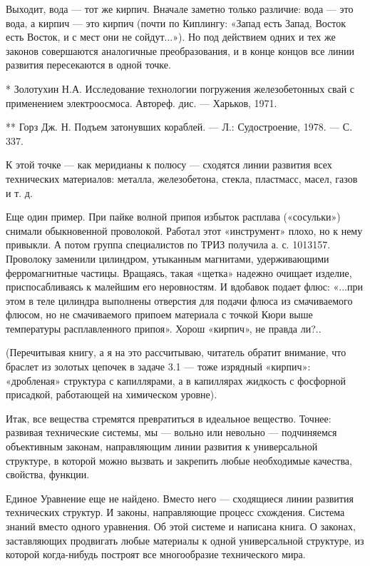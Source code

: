 Выходит, вода — тот же кирпич. Вначале заметно только различие: вода —
это вода, а кирпич — это кирпич (почти по Киплингу: «Запад есть Запад,
Восток есть  Восток, и  с мест  они не  сойдут...»). Но  под действием
одних и  тех же  законов совершаются  аналогичные преобразования,  и в
конце концов все линии развития пересекаются в одной точке.


*  Золотухин Н.А.  Исследование  технологии погружения  железобетонных
свай с применением электроосмоса. Автореф. дис. — Харьков, 1971.

** Горз Дж. Н. Подъем затонувших кораблей. — Л.: Судостроение, 1978. —
С. 337.


К этой точке  — как меридианы к полюсу —  сходятся линии развития всех
технических  материалов:  металла,  железобетона,  стекла,  пластмасс,
масел, газов и т. д.

Еще один пример. При пайке волной припоя избыток расплава («сосульки»)
снимали обыкновенной  проволокой. Работал этот «инструмент»  плохо, но
к  нему  привыкли.  А  потом  группа  специалистов  по  ТРИЗ  получила
а.  с. 1013157.  Проволоку  заменили  цилиндром, утыканным  магнитами,
удерживающими ферромагнитные частицы.  Вращаясь, такая «щетка» надежно
очищает  изделие,  приспосабливаясь  к  малейшим  его  неровностям.  И
вдобавок подает флюс: «...при этом в теле цилиндра выполнены отверстия
для подачи  флюса из смачиваемого  флюсом, но не  смачиваемого припоем
материала с точкой Кюри выше температуры расплавленного припоя». Хорош
«кирпич», не правда ли?..

(Перечитывая книгу, а я на это рассчитываю, читатель обратит внимание,
что браслет из золотых цепочек в  задаче 3.1 — тоже изрядный «кирпич»:
«дробленая»  структура  с  капиллярами,  а  в  капиллярах  жидкость  с
фосфорной присадкой, работающей на химическом уровне).

Итак,  все  вещества  стремятся  превратиться  в  идеальное  вещество.
Точнее:  развивая  технические  системы,  мы  —  вольно  или  невольно
—  подчиняемся  объективным  законам, направляющим  линии  развития  к
универсальной  структуре, в  которой можно  вызвать и  закрепить любые
необходимые качества, свойства, функции.


Единое  Уравнение  еще не  найдено.  Вместо  него —  сходящиеся  линии
развития   технических  структур.   И  законы,   направляющие  процесс
схождения. Система знаний  вместо одного уравнения. Об  этой системе и
написана книга.  О законах, заставляющих продвигать  любые материалы к
одной универсальной  структуре, из  которой когда-нибудь  построят все
многообразие технического мира.


